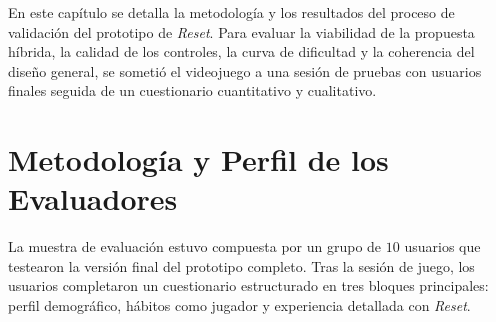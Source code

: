 En este capítulo se detalla la metodología y los resultados del proceso de validación del prototipo de \textit{Reset}. Para evaluar la viabilidad de la propuesta híbrida, la calidad de los controles, la curva de dificultad y la coherencia del diseño general, se sometió el videojuego a una sesión de pruebas con usuarios finales seguida de un cuestionario cuantitativo y cualitativo.

\section{Metodología y Perfil de los Evaluadores}
La muestra de evaluación estuvo compuesta por un grupo de $10$ usuarios que testearon la versión final del prototipo completo. Tras la sesión de juego, los usuarios completaron un cuestionario estructurado en tres bloques principales: perfil demográfico, hábitos como jugador y experiencia detallada con \textit{Reset}.


